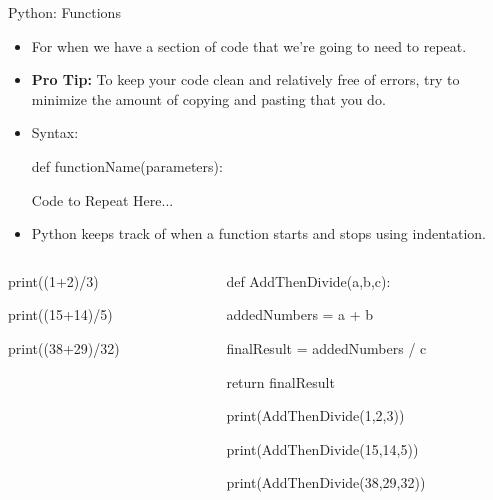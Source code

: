 \documentclass[10pt, aspectratio=169]{beamer}
\begin{document}
\begin{frame}{Python: Functions}
    \begin{itemize}
        \item For when we have a section of code that we're going to need to repeat.
        \item \textbf{Pro Tip:} To keep your code clean and relatively free of errors, try to minimize the amount of copying and pasting that you do.
        \item Syntax:
        \begin{center}
            def functionName(parameters):

                Code to Repeat Here...
        \end{center}
        \item Python keeps track of when a function starts and stops using indentation.
    \end{itemize}
    \vspace{0.25cm}
    \begin{columns}
        \begin{column}{0.5\textwidth}
            print((1+2)/3)

            print((15+14)/5)

            print((38+29)/32)
        \end{column}
        \begin{column}{0.5\textwidth}
            def AddThenDivide(a,b,c):

                \hspace{0.25cm} addedNumbers = a + b

                \hspace{0.25cm} finalResult = addedNumbers / c

                \hspace{0.25cm} return finalResult
            \vspace{0.25cm}

            print(AddThenDivide(1,2,3))

            print(AddThenDivide(15,14,5))
            
            print(AddThenDivide(38,29,32))
        \end{column}
    \end{columns}
\end{frame}
\end{document}
